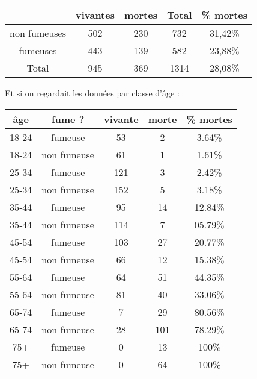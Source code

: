 \documentclass[10pt,dvipsnames, dvips, svgnames]{article}
\begin{document}
\begin{center}
\begin{tabular}[]{|c |c |c |c | c |}
\hline & vivantes & mortes & Total & \% mortes \\
\hline \hline  non  fumeuses & 502 & 230 & 732 & 31,42\% \\
\hline fumeuses & 443 & 139 & 582 & 23,88\% \\
\hline Total & 945 & 369 & 1314 & 28,08\% \\
\hline 
\end{tabular} 
\end{center}

Et si on regardait les données par classe d'âge :




\begin{center}
\begin{tabular}[]{|c |c |c |c |c |}
\hline âge & fume ? & vivante & morte &  \% mortes \\
\hline \hline 18‐24 & fumeuse & 53 & 2 & 3.64\% \\
\hline 18‐24 & non  fumeuse & 61 & 1 & 1.61\% \\
\hline 25‐34 & fumeuse & 121 & 3 & 2.42\% \\
\hline 25‐34 & non  fumeuse & 152 & 5 & 3.18\% \\
\hline 35‐44 & fumeuse & 95 & 14 & 12.84\% \\
\hline 35‐44 & non  fumeuse & 114 & 7 & 05.79\% \\
\hline 45‐54 & fumeuse & 103 & 27 & 20.77\% \\
\hline 45‐54 & non  fumeuse & 66 & 12 & 15.38\% \\
\hline 55‐64 & fumeuse & 64 & 51 & 44.35\% \\
\hline 55‐64 & non  fumeuse & 81 & 40 & 33.06\% \\
\hline 65‐74 & fumeuse & 7 & 29 & 80.56\% \\
\hline 65‐74 & non  fumeuse & 28 & 101 & 78.29\% \\
\hline 75+ & fumeuse & 0 & 13 & 100\% \\
\hline 75+ & non  fumeuse & 0 & 64 & 100\% \\
\hline 
\end{tabular} 
\end{center}
\end{document}
